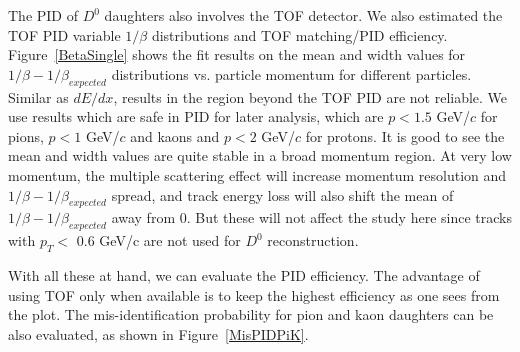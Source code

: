 The PID of $D^0$ daughters also involves the TOF detector. We also estimated the TOF PID variable $1/\beta$ distributions and TOF matching/PID efficiency. Figure~\ref{BetaSingle} shows the fit results on the mean and width values for $1/\beta-1/\beta_{expected}$ distributions vs. particle momentum for different particles. Similar as $dE/dx$, results in the region beyond the TOF PID are not reliable. We use results which are safe in PID for later analysis, which are $p<1.5$ GeV/$c$ for pions, $p<1$ GeV/$c$ and kaons and $p<2$ GeV/$c$ for protons. It is good to see the mean and width values are quite stable in a broad momentum region. At very low momentum, the multiple scattering effect will increase momentum resolution and $1/\beta-1/\beta_{expected}$ spread, and track energy loss will also shift the mean of $1/\beta-1/\beta_{expected}$ away from 0. But these will not affect the study here since tracks with $p_T < $ 0.6 GeV/c are not used for $D^0$ reconstruction. 

\begin{figure}
\end{figure}

With all these at hand, we can evaluate the PID efficiency. The advantage of using TOF only when available is to keep the highest efficiency as one sees from the plot. The mis-identification probability for pion and kaon daughters can be also evaluated, as shown in Figure~\ref{MisPIDPiK}. 

